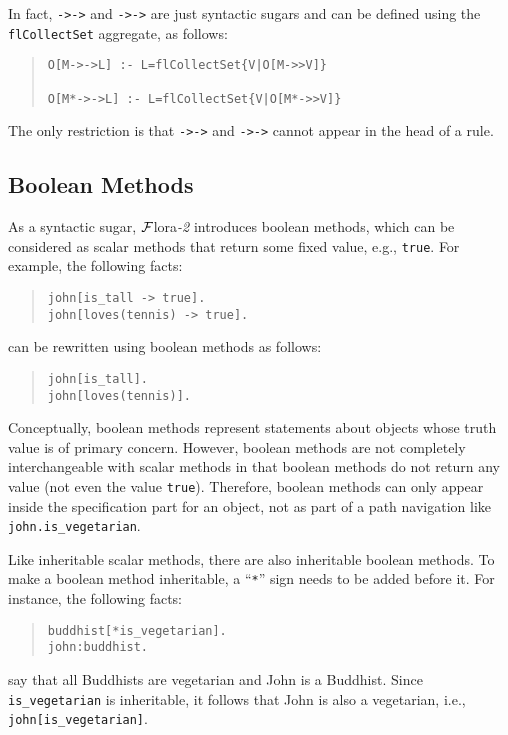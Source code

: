 \documentclass[11pt]{article}
\newcommand{\FLORA}{{\mbox{${\cal F}${\sc lora}\rm\emph{-2}}}\xspace}
\begin{document}
In fact, {\tt ->->} and {\tt *->->} are just syntactic sugars and can be
defined using the {\tt flCollectSet} aggregate, as follows:
\begin{quote}
\begin{verbatim}
O[M->->L] :- L=flCollectSet{V|O[M->>V]}

O[M*->->L] :- L=flCollectSet{V|O[M*->>V]}
\end{verbatim}
\end{quote}

The only restriction is that {\tt ->->} and {\tt *->->} cannot appear in
the head of a rule.


\subsection{Boolean Methods}


%
As a syntactic sugar, \FLORA introduces boolean methods, which can be
considered as scalar methods that return some fixed value, e.g.,
{\tt true}. For example, the following facts:
\begin{quote}
\verb|john[is_tall -> true].| \\
\verb|john[loves(tennis) -> true].|
\end{quote}
can be rewritten using boolean methods as follows:
\begin{quote}
\verb|john[is_tall].| \\
\verb|john[loves(tennis)].|
\end{quote}

Conceptually, boolean methods represent statements about objects whose
truth value is of primary concern. However, boolean methods are not
completely interchangeable with scalar methods in that boolean methods
do not return any value (not even the value {\tt true}). Therefore,
boolean methods can only appear inside the specification part for an
object, not as part of a path navigation like
\mbox{\tt john.is\_vegetarian}.

Like inheritable scalar methods, there are also inheritable boolean
methods. To make a boolean method inheritable, a ``\verb|*|'' sign
needs to be added before it. For instance, the following facts:
\begin{quote}
\begin{verbatim}
buddhist[*is_vegetarian].
john:buddhist.
\end{verbatim}
\end{quote}
say that all Buddhists are vegetarian and {\sf John} is a
Buddhist. Since \verb|is_vegetarian| is inheritable, it follows that
{\sf John} is also a vegetarian, i.e., \verb|john[is_vegetarian]|.
\end{document}
